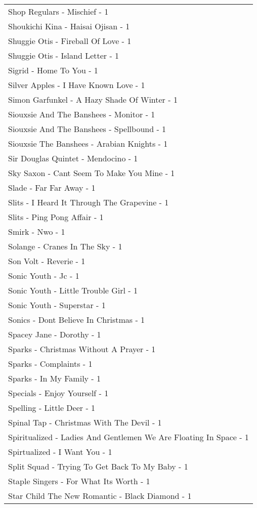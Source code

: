 \documentclass[
]{article}
\begin{document}
\begin{longtable}{l}
Shop Regulars - Mischief - 1 \\ 
Shoukichi Kina - Haisai Ojisan - 1 \\ 
Shuggie Otis - Fireball Of Love - 1 \\ 
Shuggie Otis - Island Letter - 1 \\ 
Sigrid - Home To You - 1 \\ 
Silver Apples - I Have Known Love - 1 \\ 
Simon Garfunkel - A Hazy Shade Of Winter - 1 \\ 
Siouxsie And The Banshees - Monitor - 1 \\ 
Siouxsie And The Banshees - Spellbound - 1 \\ 
Siouxsie The Banshees - Arabian Knights - 1 \\ 
Sir Douglas Quintet - Mendocino - 1 \\ 
Sky Saxon - Cant Seem To Make You Mine - 1 \\ 
Slade - Far Far Away - 1 \\ 
Slits - I Heard It Through The Grapevine - 1 \\ 
Slits - Ping Pong Affair - 1 \\ 
Smirk - Nwo - 1 \\ 
Solange - Cranes In The Sky - 1 \\ 
Son Volt - Reverie - 1 \\ 
Sonic Youth - Jc - 1 \\ 
Sonic Youth - Little Trouble Girl - 1 \\ 
Sonic Youth - Superstar - 1 \\ 
Sonics - Dont Believe In Christmas - 1 \\ 
Spacey Jane - Dorothy - 1 \\ 
Sparks - Christmas Without A Prayer - 1 \\ 
Sparks - Complaints - 1 \\ 
Sparks - In My Family - 1 \\ 
Specials - Enjoy Yourself - 1 \\ 
Spelling - Little Deer - 1 \\ 
Spinal Tap - Christmas With The Devil - 1 \\ 
Spiritualized - Ladies And Gentlemen We Are Floating In Space - 1 \\ 
Spirtualized - I Want You - 1 \\ 
Split Squad - Trying To Get Back To My Baby - 1 \\ 
Staple Singers - For What Its Worth - 1 \\ 
Star Child The New Romantic - Black Diamond - 1 \\ 

\end{longtable}
\end{document}
